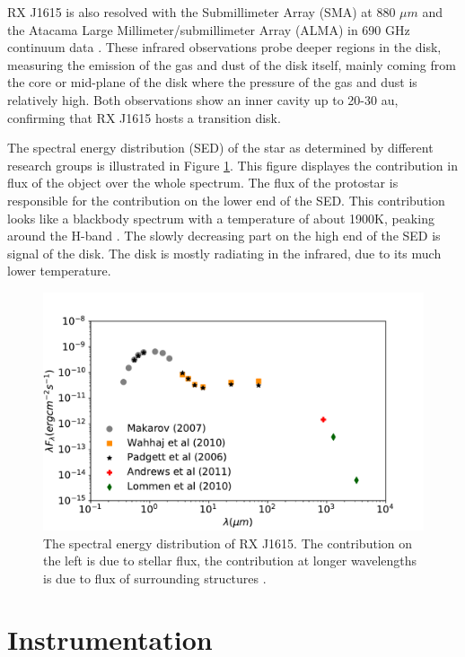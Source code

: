 \documentclass[twoside,single,12pt]{lion-msc}
\begin{document}
RX J1615 is also resolved with the Submillimeter Array (SMA) at 880 $\mu m$ \citep{Andrews2011} and the  Atacama Large Millimeter/submillimeter Array (ALMA) in 690 GHz continuum data \citep{VanderMarel2015}. These infrared observations probe deeper regions in the disk, measuring the emission of the gas and dust of the disk itself, mainly coming from the core or mid-plane of the disk where the pressure of the gas and dust is relatively high. Both observations show an inner cavity up to 20-30 au, confirming that RX J1615 hosts a transition disk. 
\bigskip

The spectral energy distribution (SED) of the star as determined by different research groups is illustrated in Figure \ref{fig:SED}. This figure displayes the contribution in flux of the object over the whole spectrum. The flux of the protostar is responsible for the contribution on the lower end of the SED. This contribution looks like a blackbody spectrum with a temperature of about 1900K, peaking around the H-band \citep{Padgett2008}. The slowly decreasing part on the high end of the SED is signal of the disk. The disk is mostly radiating in the infrared, due to its much lower temperature.

\begin{figure}[htb]
\centering
\includegraphics[width = \textwidth]{SEDnew.pdf}
\caption{The spectral energy distribution of RX J1615. The contribution on the left is due to stellar flux, the contribution at longer wavelengths is due to flux of surrounding structures \cite{Makarov2007}\cite{Wahhaj2010}\citep{Padgett2008}\citep{Andrews2011}\citep{Lommen2010}.}
\label{fig:SED}
\end{figure}

\chapter{Instrumentation}
\end{document}
